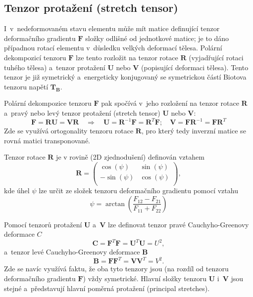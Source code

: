 
\subsection{Tenzor protažení (stretch tensor)}
I~v~nedeformovaném stavu elementu může mít matice definující tenzor deformačního gradientu $\bm{F}$ složky odlišné od jednotkové matice; je to dáno případnou rotací elementu v~důsledku velkých deformací tělesa.  Polární dekompozicí tenzoru $\bm{F}$ lze tento rozložit na tenzor rotace $\bm{R}$ (vyjadřující rotaci tuhého tělesa) a~tenzor protažení $\bm{U}$ nebo $\bm{V}$ (popisující deformaci tělesa). Tento tenzor je již symetrický a~energeticky konjugovaný se symetrickou částí Biotova tenzoru napětí $\bm{T_B}$. 

Polární dekompozice tenzoru $\bm{F}$ pak spočívá v~jeho rozložení na tenzor 
rotace $\bm{R}$ a~pravý nebo levý tenzor protažení (stretch tensor) $\bm{U}$ nebo $\bm{V}$:
\begin{equation}
	\bm{F} = \bm{R} \bm{U} = \bm{V} \bm{R}
	\quad\Rightarrow\quad
	\bm{U} = \bm{R}^{-1} \bm{F} = \bm{R}^T \bm{F};
	\quad
	\bm{V} = \bm{F} \bm{R}^{-1} = \bm{F} \bm{R}^T
\end{equation}
Zde se využívá ortogonality tenzoru rotace $\bm{R}$, pro který tedy inverzní matice se rovná matici transponované.

Tenzor rotace $\bm{R}$ je v rovině (2D zjednodušení) definován vztahem
\begin{equation}
	\bm{R} = \begin{pmatrix}
		\cos(\psi) & \sin(\psi)\\
		-\sin(\psi) & \cos(\psi)\\
	\end{pmatrix},
\end{equation}
kde úhel $\psi$ lze určit ze složek tenzoru deformačního gradientu pomocí vztahu
\begin{equation}
	\psi = \arctan\left(\frac{F_{12} - F_{21}}{F_{11} + F_{22}}\right)
\end{equation}

Pomocí tenzorů protažení $\bm{U}$ a~$\bm{V}$ lze definovat tenzor pravé Cauchyho-Greenovy deformace $C$
\begin{equation}
\bm{C} = \bm{F}^T \bm{F} = \bm{U}^T \bm{U} = U^2,
\end{equation}
a~tenzor levé Cauchyho-Greenovy deformace $\bm{B}$
\begin{equation}
	\bm{B} = \bm{F} \bm{F}^T = \bm{V} \bm{V}^T = V^2.
\end{equation}
Zde se navíc využívá faktu, že oba tyto tenzory jsou (na rozdíl od tenzoru deformačního gradientu $\bm{F}$) vždy symetrické. Hlavní složky tenzoru $\bm{U}$ i~$\bm{V}$ jsou stejné a~představují hlavní poměrná protažení (principal stretches). 
